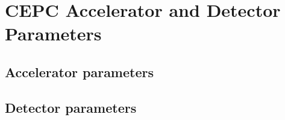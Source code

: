 \section{CEPC Accelerator and Detector Parameters}
\label{sec:detector}

\subsection{Accelerator parameters}
\subsection{Detector parameters}
